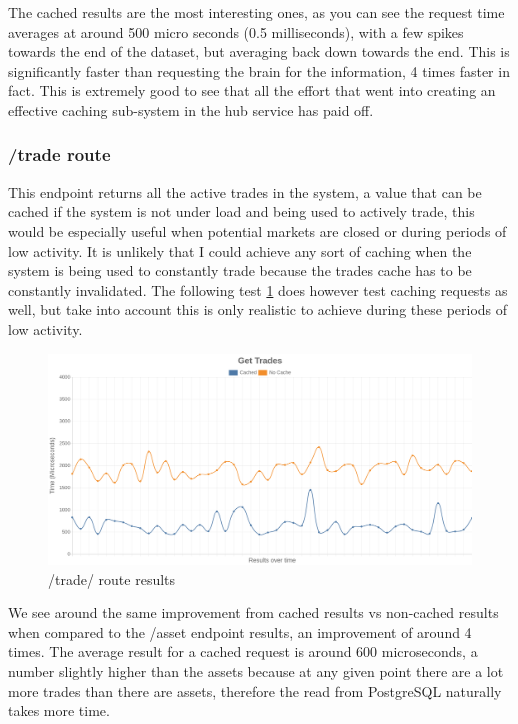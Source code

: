 \documentclass[titlepage]{article}
\begin{document}
The cached results are the most interesting ones, as you can see the request time averages at around 500 micro seconds (0.5 milliseconds), with a few spikes towards the end of the dataset, but averaging back down towards the end. This is significantly faster than requesting the brain for the information, 4 times faster in fact. This is extremely good to see that all the effort that went into creating an effective caching sub-system in the hub service has paid off.

\pagebreak
\subsubsection{/trade route}
This endpoint returns all the active trades in the system, a value that can be cached if the system is not under load and being used to actively trade, this would be especially useful when potential markets are closed or during periods of low activity. It is unlikely that I could achieve any sort of caching when the system is being used to constantly trade because the trades cache has to be constantly invalidated. The following test \ref{gettrade-test} does however test caching requests as well, but take into account this is only realistic to achieve during these periods of low activity.

\begin{figure}[h!]
\includegraphics[width=\textwidth]{../results/get-trades.png}
  \caption{/trade/ route results}
  \label{gettrade-test}
\end{figure}

We see around the same improvement from cached results vs non-cached results when compared to the /asset endpoint results, an improvement of around 4 times. The average result for a cached request is around 600 microseconds, a number slightly higher than the assets because at any given point there are a lot more trades than there are assets, therefore the read from PostgreSQL naturally takes more time. \\
\end{document}

